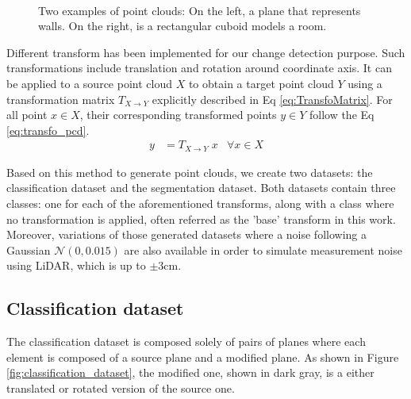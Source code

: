\begin{figure}
\begin{subfigure}{.48\linewidth}
    \end{subfigure}\\
    \caption{Two examples of point clouds: On the left, a plane that represents walls. On the right, is a rectangular cuboid models a room.}
    \label{fig:06_planeroom}
\end{figure}

Different transform has been implemented for our change detection purpose. Such transformations include translation and rotation around coordinate axis. It can be applied to a source point cloud $X$ to obtain a target point cloud $Y$ using a transformation matrix $T_{X \rightarrow Y}$ explicitly described in Eq \ref{eq:TransfoMatrix}. For all point $x \in X$, their corresponding transformed points $y \in Y$ follow the Eq \ref{eq:transfo_pcd}. 
\begin{align}
    \label{eq:transfo_pcd}
    y &= T_{X \rightarrow Y}\; x  & \forall x \in X
\end{align}

Based on this method to generate point clouds, we create two datasets: the classification dataset and the segmentation dataset. Both datasets contain three classes: one for each of the aforementioned transforms, along with a class where no transformation is applied, often referred as the 'base' transform in this work. Moreover, variations of those generated datasets where a noise following a Gaussian $\mathcal{N}(0,0.015)$ are also available in order to simulate measurement noise using LiDAR, which is up to $\pm 3$cm.
\subsection{Classification dataset}
The classification dataset is composed solely of pairs of planes where each element is composed of a source plane and a modified plane. As shown in Figure \ref{fig:classification_dataset}, the modified one, shown in dark gray, is a either translated or rotated version of the source one.\\

